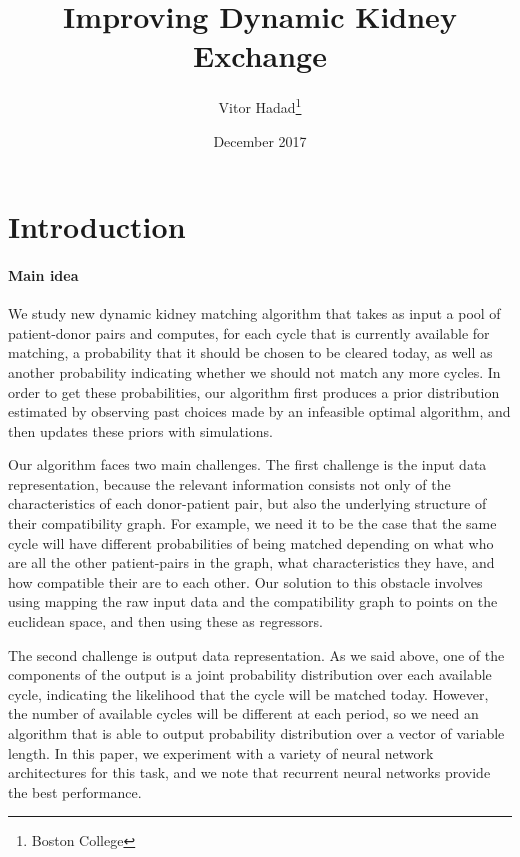 \documentclass[12pt]{article}
\begin{document}
\begin{titlepage}
\title{Improving Dynamic Kidney Exchange}
\author{Vitor Hadad\thanks{Boston College}} 
\date{December 2017}
\maketitle
\begin{abstract}

\bigskip
\end{abstract}
\setcounter{page}{0}
\thispagestyle{empty}
\end{titlepage}
\pagebreak 

\doublespacing

\linenumbers


\section{Introduction} \label{sec:introduction}


\paragraph{Main idea} We study new dynamic kidney matching algorithm that takes as input a pool of patient-donor pairs and computes, for each cycle that is currently available for matching, a probability that it should be chosen to be cleared today, as well as another probability indicating whether we should not match any more cycles. In order to get these probabilities, our algorithm first produces a prior distribution estimated by observing past choices made by an infeasible optimal algorithm, and then updates these priors with simulations. 

Our algorithm faces two main challenges. The first challenge is the input data representation, because the relevant information consists not only of the characteristics of each donor-patient pair, but also the underlying structure of their compatibility graph. For example, we need it to be the case that the same cycle will have different probabilities of being matched depending on what who are all the other patient-pairs in the graph, what characteristics they have, and how compatible their are to each other. Our solution to this obstacle involves using mapping the raw input data and the compatibility graph to points on the euclidean space, and then using these as regressors.

The second challenge is output data representation. As we said above, one of the components of the output is a joint probability distribution over each available cycle, indicating the likelihood that the cycle will be matched today. However, the number of available cycles will be different at each period, so we need an algorithm that is able to output probability distribution over a vector of variable length. In this paper, we experiment with a variety of neural network architectures for this task, and we note that recurrent neural networks provide the best performance.
\end{document}
